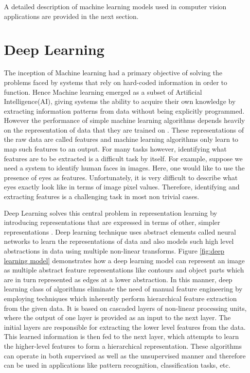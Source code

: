 A detailed description of machine learning models used in computer vision applications are provided in the next section.


\section{Deep Learning}
\label{sec:fundamentals:deeplearning}


The inception of Machine learning had a primary objective of solving the problems faced by systems that rely on hard-coded information in order to function. Hence Machine learning emerged as a subset of Artificial Intelligence(AI), giving systems the ability to acquire their own knowledge by extracting information patterns from data without being explicitly programmed. However the performance of simple machine learning algorithms depends heavily on the representation of data that they are trained on \cite{Goodfellow-et-al-2016}. These representations of the raw data are called features and machine learning algorithms only learn to map such features to an output. 
For many tasks however, identifying what features are to be extracted is a difficult task by itself. For example, suppose we need a system to identify human faces in images. Here, one would like to use the presence of eyes as features. Unfortunately, it is very difficult to describe what eyes exactly look like in terms of image pixel values. Therefore, identifying and extracting features is a challenging task in most non trivial cases.

Deep Learning solves this central problem in representation learning by introducing representations that are expressed in terms of other, simpler representations \cite{Goodfellow-et-al-2016}. Deep learning technique uses abstract elements called neural networks to learn the representations of data and also models such high level abstractions in data using multiple non-linear transforms. Figure \ref{fig:deep learning model} demonstrates how a deep learning model can represent an image as multiple abstract feature representations like contours and object parts which are in turn represented as edges at a lower abstraction.
In this manner, deep learning class of algorithms eliminate the need of manual feature engineering by employing techniques which inherently perform hierarchical feature extraction from the given data.
It is based on cascaded layers of non-linear processing units, where the output of one layer is provided as an input to the next layer. The initial
layers are responsible for extracting the lower level features from the data. This learned information is then
fed to the next layer, which attempts to learn the higher-level features to form a hierarchical representation.
These algorithms can operate in both supervised as well as the unsupervised manner and therefore can be
used in applications like pattern recognition, classification tasks, etc.



